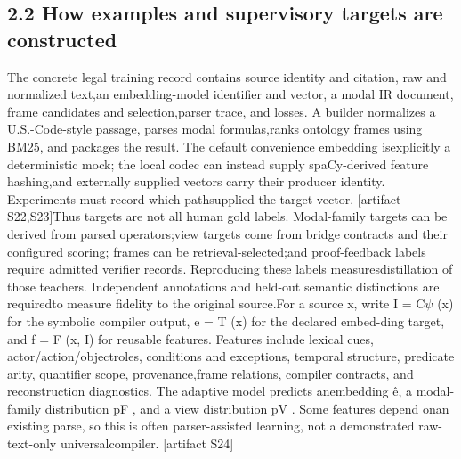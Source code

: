 \subsection*{2.2  How examples and supervisory targets are constructed}
\noindent
The concrete legal training record contains source identity and citation, raw and normalized text,\linebreak[4]
an embedding-model identifier and vector, a modal IR document, frame candidates and selection,\linebreak[4]
parser trace, and losses. A builder normalizes a U.S.-Code-style passage, parses modal formulas,\linebreak[4]
ranks ontology frames using BM25, and packages the result. The default convenience embedding is\linebreak[4]
explicitly a deterministic mock; the local codec can instead supply spaCy-derived feature hashing,\linebreak[4]
and externally supplied vectors carry their producer identity. Experiments must record which path\linebreak[4]
supplied the target vector. [artifact S22,S23]\linebreak[4]
Thus targets are not all human gold labels. Modal-family targets can be derived from parsed operators;\linebreak[4]
view targets come from bridge contracts and their configured scoring; frames can be retrieval-selected;\linebreak[4]
and proof-feedback labels require admitted verifier records. Reproducing these labels measures\linebreak[4]
distillation of those teachers. Independent annotations and held-out semantic distinctions are required\linebreak[4]
to measure fidelity to the original source.\linebreak[4]
For a source x, write I = C\ensuremath{\psi} (x) for the symbolic compiler output, e = T (x) for the declared embed-\linebreak[4]
ding target, and f = F (x, I) for reusable features. Features include lexical cues, actor/action/object\linebreak[4]
roles, conditions and exceptions, temporal structure, predicate arity, quantifier scope, provenance,\linebreak[4]
frame relations, compiler contracts, and reconstruction diagnostics. The adaptive model predicts an\linebreak[4]
embedding \^{e}, a modal-family distribution pF , and a view distribution pV . Some features depend on\linebreak[4]
an existing parse, so this is often parser-assisted learning, not a demonstrated raw-text-only universal\linebreak[4]
compiler. [artifact S24]\par

